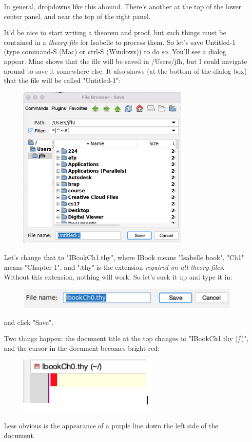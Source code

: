 In general, dropdowns like this abound. There's another at the top of the lower center panel, and near the top of the right panel. 

It'd be nice to start writing a theorem and proof, but such things must be contained in a \textit{theory file} for Isabelle to process them. So let's save Untitled-1 (type command-S (Mac) or ctrl-S (Windows)) to do so. You'll see a dialog appear. Mine shows that the file will be saved in /Users/jfh, but I could navigate around to save it somewhere else. It also shows (at the bottom of the dialog box) that the file will be called "Untitled-1":
\begin{figure}[h]
    \centering
    \includegraphics[width=0.5\linewidth]{file-chooser.png}
\end{figure}
Let's change that to "IBookCh1.thy", where IBook means "Isabelle book", "Ch1" means "Chapter 1", and ".thy" is the extension \textit{required on all theory files}. Without this extension, nothing will work. So let's suck it up and type it in:
\begin{figure}[h]
    \centering
    \includegraphics[width=0.75\linewidth]{file-name-edit.png}
\end{figure}
and click "Save". 

Two things happen: the document title at the top changes to "IBookCh1.thy (\~/)", and the cursor in the document becomes bright red:
\begin{figure}[h]
    \centering
    \includegraphics[width=0.5\linewidth]{interface-file-response.png}
\end{figure}
Less obvious is the appearance of a purple line down the left side of the document. 

